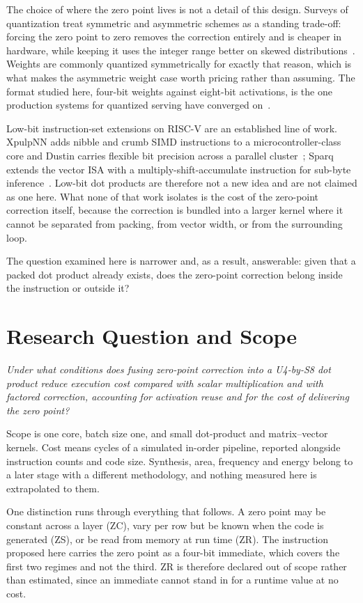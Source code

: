 The choice of where the zero point lives is not a detail of this design. Surveys
of quantization treat symmetric and asymmetric schemes as a standing trade-off:
forcing the zero point to zero removes the correction entirely and is cheaper in
hardware, while keeping it uses the integer range better on skewed
distributions~\cite{gholami}. Weights are commonly quantized symmetrically for
exactly that reason, which is what makes the asymmetric weight case worth
pricing rather than assuming. The format studied here, four-bit weights against
eight-bit activations, is the one production systems for quantized serving have
converged on~\cite{qserve}.

Low-bit instruction-set extensions on RISC-V are an established line of work.
XpulpNN adds nibble and crumb SIMD instructions to a microcontroller-class core
and Dustin carries flexible bit precision across a parallel
cluster~\cite{xpulpnn,dustin}; Sparq extends the vector ISA with a
multiply-shift-accumulate instruction for sub-byte inference~\cite{sparq}.
Low-bit dot products are therefore not a new idea and are not claimed as one
here. What none of that work isolates is the cost of the zero-point correction
itself, because the correction is bundled into a larger kernel where it cannot
be separated from packing, from vector width, or from the surrounding loop.

The question examined here is narrower and, as a result, answerable: given that
a packed dot product already exists, does the zero-point correction belong
inside the instruction or outside it?

\section{Research Question and Scope}
\textit{Under what conditions does fusing zero-point correction into a
U4-by-S8 dot product reduce execution cost compared with scalar multiplication
and with factored correction, accounting for activation reuse and for the cost
of delivering the zero point?}

Scope is one core, batch size one, and small dot-product and matrix--vector
kernels. Cost means cycles of a simulated in-order pipeline, reported alongside
instruction counts and code size. Synthesis, area, frequency and energy belong
to a later stage with a different methodology, and nothing measured here is
extrapolated to them.

One distinction runs through everything that follows. A zero point may be
constant across a layer (ZC), vary per row but be known when the code is
generated (ZS), or be read from memory at run time (ZR). The instruction
proposed here carries the zero point as a four-bit immediate, which covers the
first two regimes and not the third. ZR is therefore declared out of scope
rather than estimated, since an immediate cannot stand in for a runtime value
at no cost.

